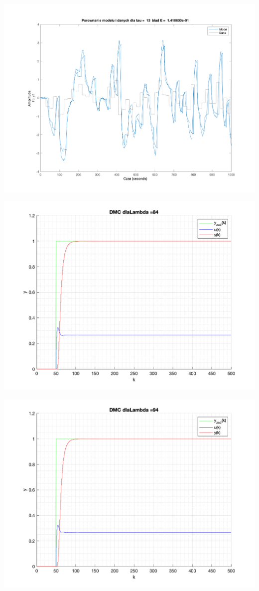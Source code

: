 \documentclass[a4paper, 11pt]{article}
\begin{document}
\begin{enumerate}
 \includegraphics[width=\linewidth]{./ModelsP1/modelTau13.png} 
 
 \includegraphics[width=\linewidth]{./ModelsP4_Lambda/P4_DMC_Lambda_84_png.png} 
 
 \includegraphics[width=\linewidth]{./ModelsP4_Lambda/P4_DMC_Lambda_94_png.png} 
 

\end{enumerate}
\end{document}
